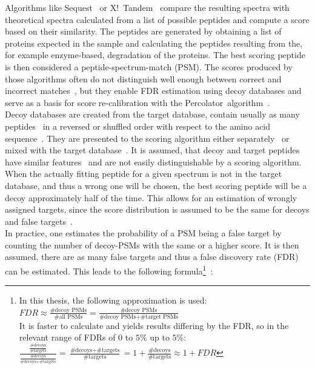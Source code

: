\documentclass[10pt,a4paper]{article}
\begin{document}
		Algorithms like Sequest~\cite{Eng1994} or X!~Tandem~\cite{Craig2004} compare the resulting spectra with theoretical spectra calculated from a list of possible peptides and compute a score based on their similarity. The peptides are generated by obtaining a list of proteins expected in the sample and calculating the peptides resulting from the, for example enzyme-based, degradation of the proteins. The best scoring peptide is then considered a peptide-spectrum-match (PSM). The scores produced by those algorithms often do not distinguish well enough between correct and incorrect matches~\cite{Kll2007}, but they enable FDR estimation using decoy databases and serve as a basis for score re-calibration with the Percolator~algorithm~\cite{Kll2007, Granholm2012}.\\
		Decoy databases are created from the target database, contain usually as  many peptides~\cite{Peng2003, Moore2002} in a reversed or shuffled order with respect to the amino acid sequence~\cite{Aggarwal2016}. They are presented to the scoring algorithm either separately~\cite{Granholm2012} or mixed with the target database~\cite{Peng2003}. It is assumed, that decoy and target peptides have similar features~\cite{Moore2002} and are not easily distinguishable by a scoring algorithm. When the actually fitting peptide for a given spectrum is not in the target database, and thus a wrong one will be chosen, the best scoring peptide will be a decoy approximately half of the time. This allows for an estimation of wrongly assigned targets, since the score distribution is assumed to be the same for decoys and false targets~\cite{Aggarwal2016}.\\
		In practice, one estimates the probability of a PSM being a false target by counting the number of decoy-PSMs with the same or a higher score. It is then assumed, there are as many false targets and thus a false discovery rate (FDR) can be estimated. This leads to the following formula\footnote{In this thesis, the following approximation is used:\\
		$FDR \approx \frac{\text{\# decoy PSMs}}{\text{\# all PSMs}} = \frac{\text{\# decoy PSMs}}{\text{\# decoy PSMs} + \text{\# target PSMs}}$\\
		It is faster to calculate and yields results differing by the FDR, so in the relevant range of FDRs of $0$ to $5\%$ up to $5\%$:\\
		$\frac{\frac{\text{\# decoys}}{\text{\# targets}}}{\frac{\text{\# decoys}}{\text{\# decoys} + \text{\# targets}}} = \frac{\text{\# decoys} + \text{\# targets}}{\text{\# targets}} = 1 + \frac{\text{\# decoys}}{\text{\# targets}} \approx 1 + FDR$}~\cite{Granholm2012}:
\end{document}
